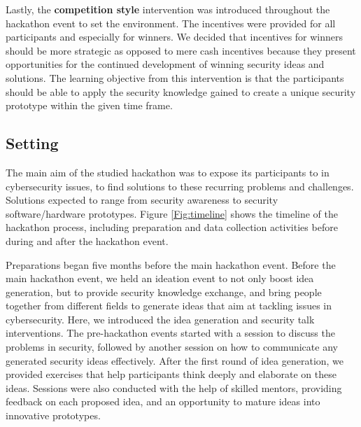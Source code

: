 \documentclass[runningheads]{llncs}
\begin{document}
Lastly, the \textbf{competition style} intervention was introduced throughout the hackathon event to set the environment. The incentives were provided for all participants and especially for winners. We decided that incentives for winners should be more strategic as opposed to mere cash incentives because they present opportunities for the continued development of winning security ideas and solutions. The learning objective from this intervention is that the participants should be able to apply the security knowledge gained to create a unique security prototype within the given time frame.

\subsection{Setting}\label{Sec:setting}
The main aim of the studied hackathon was to expose its participants to in cybersecurity issues, to find solutions to these recurring problems and challenges. Solutions expected to range from security awareness to security software/hardware prototypes. Figure \ref{Fig:timeline} shows the timeline of the hackathon process, including preparation and data collection activities before during and after the hackathon event.

Preparations began five months before the main hackathon event. Before the main hackathon event, we held an ideation event to not only boost idea generation, but to provide security knowledge exchange, and bring people together from different fields to generate ideas that aim at tackling issues in cybersecurity. Here, we introduced the idea generation and security talk interventions. The pre-hackathon events started with a session to discuss the problems in security, followed by another session on how to communicate any generated security ideas effectively. After the first round of idea generation, we provided exercises that help participants think deeply and elaborate on these ideas. Sessions were also conducted with the help of skilled mentors, providing feedback on each proposed idea, and an opportunity to mature ideas into innovative prototypes. %
\end{document}
